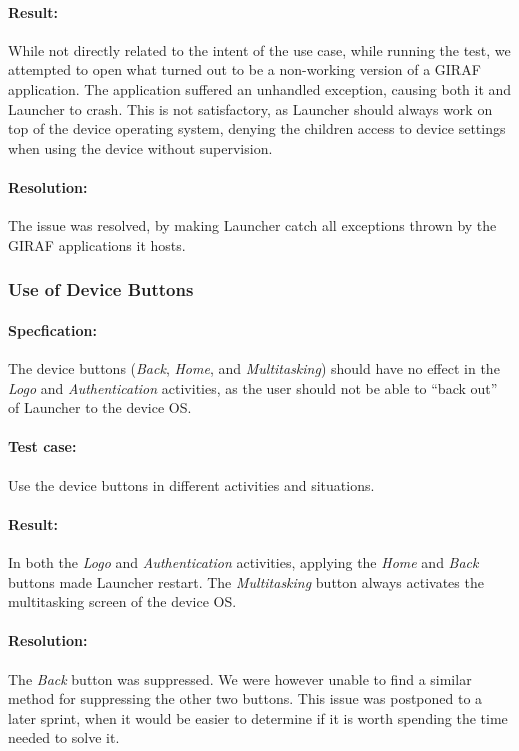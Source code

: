 \paragraph{Result:} While not directly related to the intent of the use case, while running the test, we attempted to open what turned out to be a non-working version of a GIRAF application. The application suffered an unhandled exception, causing both it and Launcher to crash. This is not satisfactory, as Launcher should always work on top of the device operating system, denying the children access to device settings when using the device without supervision.
\paragraph{Resolution:} The issue was resolved, by making Launcher catch all exceptions thrown by the GIRAF applications it hosts.

\subsubsection*{Use of Device Buttons}
\paragraph{Specfication:} The device buttons (\textit{Back}, \textit{Home}, and \textit{Multitasking}) should have no effect in the \textit{Logo} and \textit{Authentication} activities, as the user should not be able to ``back out'' of Launcher to the device OS.
\paragraph{Test case:} Use the device buttons in different activities and situations.
\paragraph{Result:} In both the \textit{Logo} and \textit{Authentication} activities, applying the \textit{Home} and \textit{Back} buttons made Launcher restart. The \textit{Multitasking} button always activates the multitasking screen of the device OS.
\paragraph{Resolution:} The \textit{Back} button was suppressed. We were however unable to find a similar method for suppressing the other two buttons. This issue was postponed to a later sprint, when it would be easier to determine if it is worth spending the time needed to solve it.